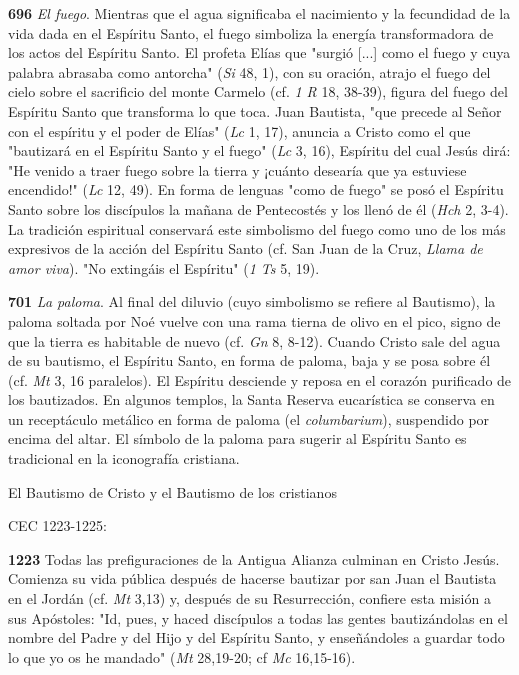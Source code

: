 \documentclass[]{article}
\begin{document}
\textbf{696} \emph{El fuego}. Mientras que el agua significaba el
nacimiento y la fecundidad de la vida dada en el Espíritu Santo, el
fuego simboliza la energía transformadora de los actos del Espíritu
Santo. El profeta Elías que "surgió {[}...{]} como el fuego y cuya
palabra abrasaba como antorcha" (\emph{Si} 48, 1), con su oración,
atrajo el fuego del cielo sobre el sacrificio del monte Carmelo (cf.
\emph{1 R} 18, 38-39), figura del fuego del Espíritu Santo que
transforma lo que toca. Juan Bautista, "que precede al Señor con el
espíritu y el poder de Elías" (\emph{Lc} 1, 17), anuncia a Cristo como
el que "bautizará en el Espíritu Santo y el fuego" (\emph{Lc} 3, 16),
Espíritu del cual Jesús dirá: "He venido a traer fuego sobre la tierra y
¡cuánto desearía que ya estuviese encendido!" (\emph{Lc} 12, 49). En
forma de lenguas "como de fuego" se posó el Espíritu Santo sobre los
discípulos la mañana de Pentecostés y los llenó de él (\emph{Hch} 2,
3-4). La tradición espiritual conservará este simbolismo del fuego como
uno de los más expresivos de la acción del Espíritu Santo (cf. San Juan
de la Cruz, \emph{Llama de amor viva}). "No extingáis el Espíritu"
(\emph{1 Ts} 5, 19).

\textbf{701} \emph{La paloma}. Al final del diluvio (cuyo simbolismo se
refiere al Bautismo), la paloma soltada por Noé vuelve con una rama
tierna de olivo en el pico, signo de que la tierra es habitable de nuevo
(cf. \emph{Gn} 8, 8-12). Cuando Cristo sale del agua de su bautismo, el
Espíritu Santo, en forma de paloma, baja y se posa sobre él (cf.
\emph{Mt} 3, 16 paralelos). El Espíritu desciende y reposa en el corazón
purificado de los bautizados. En algunos templos, la Santa Reserva
eucarística se conserva en un receptáculo metálico en forma de paloma
(el \emph{columbarium}), suspendido por encima del altar. El símbolo de
la paloma para sugerir al Espíritu Santo es tradicional en la
iconografía cristiana.

El Bautismo de Cristo y el Bautismo de los cristianos

CEC 1223-1225:

\textbf{1223} Todas las prefiguraciones de la Antigua Alianza culminan
en Cristo Jesús. Comienza su vida pública después de hacerse bautizar
por san Juan el Bautista en el Jordán (cf. \emph{Mt} 3,13) y, después de
su Resurrección, confiere esta misión a sus Apóstoles: "Id, pues, y
haced discípulos a todas las gentes bautizándolas en el nombre del Padre
y del Hijo y del Espíritu Santo, y enseñándoles a guardar todo lo que yo
os he mandado" (\emph{Mt} 28,19-20; cf \emph{Mc} 16,15-16).
\end{document}
